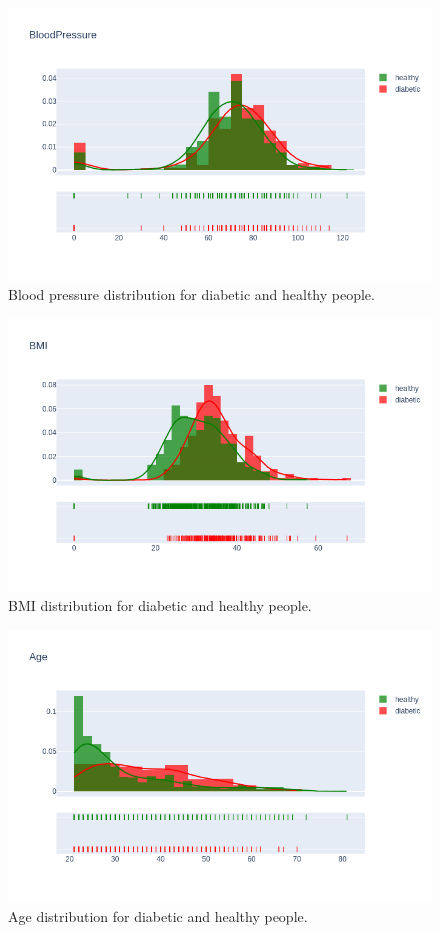 \documentclass[12pt]{article}
\begin{document}
\begin{figure}[ht]
\centering
\includegraphics[width=1\textwidth]{newplot(7).png}
\caption{Blood pressure distribution for diabetic and healthy people.}
\end{figure}

\begin{figure}[ht]
\centering
\includegraphics[width=1\textwidth]{newplot(8).png}
\caption{BMI distribution for diabetic and healthy people.}
\end{figure}

\begin{figure}[ht]
\centering
\includegraphics[width=1\textwidth]{newplot(9).png}
\caption{Age distribution for diabetic and healthy people.}
\end{figure}
\end{document}
